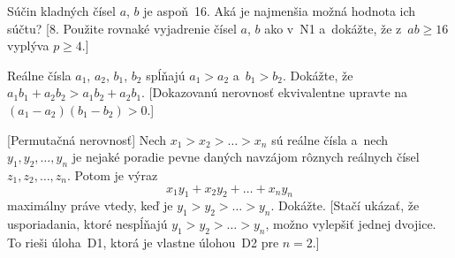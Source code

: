 {Súčin kladných čísel $a$, $b$ je aspoň~16. Aká je
najmenšia možná hodnota ich súčtu?
[8. Použite rovnaké vyjadrenie čísel $a$, $b$ ako
v~N1 a~dokážte, že z~$ab\ge16$ vyplýva $p\ge4$.]

\D
Reálne čísla $a_1$, $a_2$, $b_1$, $b_2$ spĺňajú $a_1 > a_2$
a~$b_1 > b_2$. Dokážte, že $a_1b_1 + a_2b_2 > a_1b_2 + a_2b_1$.
[Dokazovanú nerovnosť ekvivalentne upravte na $(a_1-a_2)(b_1-b_2)>0$.]

[Permutačná nerovnosť] Nech $x_1 > x_2 > \dots > x_n$ sú
reálne čísla a~nech $y_1,\allowbreak y_2, \dots ,y_n$ je nejaké poradie pevne
daných navzájom rôznych reálnych
čísel $z_1, z_2, \dots , z_n$. Potom je výraz
$$
x_1y_1 + x_2y_2 +\dots + x_ny_n
$$
maximálny práve vtedy,
keď je $y_1 > y_2 > \dots > y_n$. Dokážte. [Stačí ukázať, že
usporiadania, ktoré nespĺňajú $y_1 > y_2 > \dots > y_n$, možno vylepšiť
 jednej dvojice. To rieši úloha~D1, ktorá je vlastne úlohou~D2 pre $n=2$.]

}


